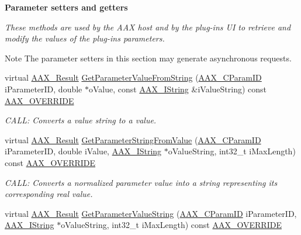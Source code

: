 \begin{Indent}{\bf Parameter setters and getters}\par
{\em These methods are used by the A\+A\+X host and by the plug-\/in\textquotesingle{}s U\+I to retrieve and modify the values of the plug-\/in\textquotesingle{}s parameters.

\begin{DoxyNote}{Note}
The parameter setters in this section may generate asynchronous requests. 
\end{DoxyNote}
}\begin{DoxyCompactItemize}
\item 
virtual \hyperlink{a00149_a4d8f69a697df7f70c3a8e9b8ee130d2f}{A\+A\+X\+\_\+\+Result} \hyperlink{a00018_a0e444bd3f3bf19ba7b98633e08c880c1}{Get\+Parameter\+Value\+From\+String} (\hyperlink{a00149_a1440c756fe5cb158b78193b2fc1780d1}{A\+A\+X\+\_\+\+C\+Param\+I\+D} i\+Parameter\+I\+D, double $\ast$o\+Value, const \hyperlink{a00113}{A\+A\+X\+\_\+\+I\+String} \&i\+Value\+String) const \hyperlink{a00149_ac2f24a5172689ae684344abdcce55463}{A\+A\+X\+\_\+\+O\+V\+E\+R\+R\+I\+D\+E}
\begin{DoxyCompactList}\small\item\em C\+A\+L\+L\+: Converts a value string to a value. \end{DoxyCompactList}\item 
virtual \hyperlink{a00149_a4d8f69a697df7f70c3a8e9b8ee130d2f}{A\+A\+X\+\_\+\+Result} \hyperlink{a00018_ab75588b6a1361661f58bea7afc358989}{Get\+Parameter\+String\+From\+Value} (\hyperlink{a00149_a1440c756fe5cb158b78193b2fc1780d1}{A\+A\+X\+\_\+\+C\+Param\+I\+D} i\+Parameter\+I\+D, double i\+Value, \hyperlink{a00113}{A\+A\+X\+\_\+\+I\+String} $\ast$o\+Value\+String, int32\+\_\+t i\+Max\+Length) const \hyperlink{a00149_ac2f24a5172689ae684344abdcce55463}{A\+A\+X\+\_\+\+O\+V\+E\+R\+R\+I\+D\+E}
\begin{DoxyCompactList}\small\item\em C\+A\+L\+L\+: Converts a normalized parameter value into a string representing its corresponding real value. \end{DoxyCompactList}\item 
virtual \hyperlink{a00149_a4d8f69a697df7f70c3a8e9b8ee130d2f}{A\+A\+X\+\_\+\+Result} \hyperlink{a00018_ae2ab6846aa92e0eab377b7a6efc08a17}{Get\+Parameter\+Value\+String} (\hyperlink{a00149_a1440c756fe5cb158b78193b2fc1780d1}{A\+A\+X\+\_\+\+C\+Param\+I\+D} i\+Parameter\+I\+D, \hyperlink{a00113}{A\+A\+X\+\_\+\+I\+String} $\ast$o\+Value\+String, int32\+\_\+t i\+Max\+Length) const \hyperlink{a00149_ac2f24a5172689ae684344abdcce55463}{A\+A\+X\+\_\+\+O\+V\+E\+R\+R\+I\+D\+E}

\end{DoxyCompactItemize}
\end{Indent}
